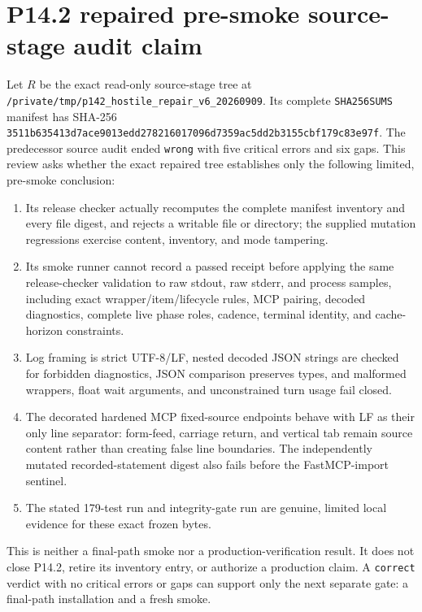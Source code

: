 \section*{P14.2 repaired pre-smoke source-stage audit claim}

Let \(R\) be the exact read-only source-stage tree at
\texttt{/private/tmp/p142\_hostile\_repair\_v6\_20260909}.  Its complete
\texttt{SHA256SUMS} manifest has SHA-256
\texttt{3511b635413d7ace9013edd278216017096d7359ac5dd2b3155cbf179c83e97f}.
The predecessor source audit ended \texttt{wrong} with five critical errors
and six gaps.  This review asks whether the exact repaired tree establishes
only the following limited, pre-smoke conclusion:

\begin{enumerate}
\item Its release checker actually recomputes the complete manifest inventory
      and every file digest, and rejects a writable file or directory; the
      supplied mutation regressions exercise content, inventory, and mode
      tampering.
\item Its smoke runner cannot record a passed receipt before applying the same
      release-checker validation to raw stdout, raw stderr, and process samples,
      including exact wrapper/item/lifecycle rules, MCP pairing, decoded
      diagnostics, complete live phase roles, cadence, terminal identity, and
      cache-horizon constraints.
\item Log framing is strict UTF-8/LF, nested decoded JSON strings are checked
      for forbidden diagnostics, JSON comparison preserves types, and malformed
      wrappers, float wait arguments, and unconstrained turn usage fail closed.
\item The decorated hardened MCP fixed-source endpoints behave with LF as their
      only line separator: form-feed, carriage return, and vertical tab remain
      source content rather than creating false line boundaries.  The
      independently mutated recorded-statement digest also fails before the
      FastMCP-import sentinel.
\item The stated 179-test run and integrity-gate run are genuine, limited local
      evidence for these exact frozen bytes.
\end{enumerate}

This is neither a final-path smoke nor a production-verification result.  It
does not close P14.2, retire its inventory entry, or authorize a production
claim.  A \texttt{correct} verdict with no critical errors or gaps can support
only the next separate gate: a final-path installation and a fresh smoke.
